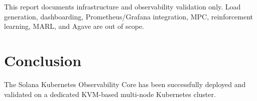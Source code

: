 \documentclass[11pt,a4paper]{article}
\begin{document}
This report documents infrastructure and observability validation only. Load generation, dashboarding, Prometheus/Grafana integration, MPC, reinforcement learning, MARL, and Agave are out of scope.

\section{Conclusion}

The Solana Kubernetes Observability Core has been successfully deployed and validated on a dedicated KVM-based multi-node Kubernetes cluster.



\end{document}
